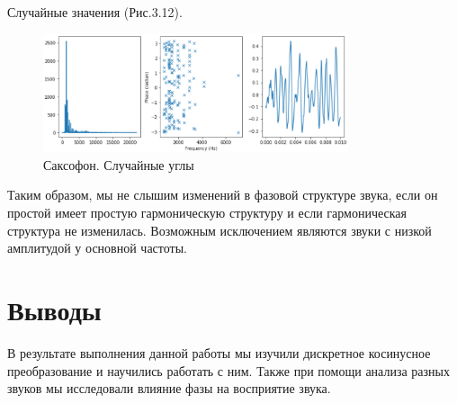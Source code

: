 \documentclass[a4paper,12pt]{report}
\begin{document}
    Случайные значения (Рис.3.12).
\begin{figure}[H]
        \centering
        \includegraphics[width=0.8\textwidth]{fig3-12.PNG}
        \caption{Саксофон. Случайные углы}
        \label{fig:fig3-12}
\end{figure}  

    Таким образом, мы не слышим изменений в фазовой структуре звука, если он простой имеет простую гармоническую структуру и если гармоническая структура не изменилась.
    Возможным исключением являются звуки с низкой амплитудой у основной частоты.
    
\chapter{Выводы}
    В результате выполнения данной работы мы изучили дискретное косинусное преобразование и научились работать с ним. Также при помощи анализа разных звуков мы исследовали влияние фазы на восприятие звука.            
\end{document}
